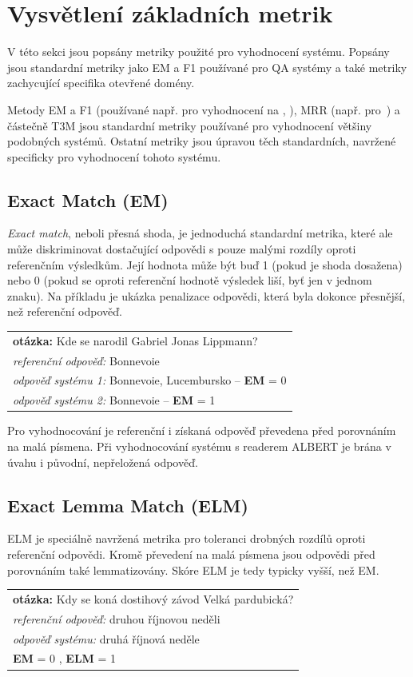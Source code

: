 \section{Vysvětlení základních metrik}
\label{metriky}
V této sekci jsou popsány metriky použité pro vyhodnocení systému. Popsány jsou standardní metriky jako EM a F1 používané pro QA systémy a také metriky zachycující specifika otevřené domény.\par
Metody EM a F1 (používané např. pro vyhodnocení na \cite{squad}, \cite{squad_v2}), MRR (např. pro~\cite{sqad}) a částečně T3M jsou standardní metriky používané pro vyhodnocení většiny podobných systémů. Ostatní metriky jsou úpravou těch standardních, navržené specificky pro vyhodnocení tohoto systému.

\subsection{Exact Match (EM)}
\label{EM}
\emph{Exact match}, neboli přesná shoda, je jednoduchá standardní metrika, které ale může diskriminovat dostačující odpovědi s pouze malými rozdíly oproti referenčním výsledkům. Její hodnota může být buď 1 (pokud je shoda dosažena) nebo 0 (pokud se oproti referenční hodnotě výsledek liší, byť jen v jednom znaku). Na příkladu je ukázka penalizace odpovědi, která byla dokonce přesnější, než referenční odpověď.\par
\begin{center}
\begin{tabular}{l}
    \textbf{otázka:} Kde se narodil Gabriel Jonas Lippmann?\\
    \emph{referenční odpověď:} Bonnevoie\\
    \emph{odpověď systému 1:} Bonnevoie, Lucembursko -- \textbf{EM} = 0\\
    \emph{odpověď systému 2:} Bonnevoie -- \textbf{EM} = 1
\end{tabular}
\end{center}
Pro vyhodnocování je referenční i získaná odpověď převedena před porovnáním na malá písmena. Při vyhodnocování systému s readerem ALBERT je brána v úvahu i původní, nepřeložená odpověď.

\subsection{Exact Lemma Match (ELM)}
\label{ELM}
ELM je speciálně navržená metrika pro toleranci drobných rozdílů oproti referenční odpovědi. Kromě převedení na malá písmena jsou odpovědi před porovnáním také lemmatizovány. Skóre ELM je tedy typicky vyšší, než EM.
\begin{center}
\begin{tabular}{l}
    \textbf{otázka:} Kdy se koná dostihový závod Velká pardubická?\\
    \emph{referenční odpověď:} druhou říjnovou neděli\\
    \emph{odpověď systému:} druhá říjnová neděle \\
    \textbf{EM} = 0 , \textbf{ELM} = 1\\
\end{tabular}
\end{center}

